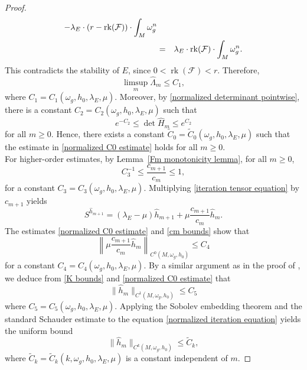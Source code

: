 \documentclass[12pt, reqno]{amsart}
\newcommand\cF{{\mathcal F}}
\newcommand{\rk}{{\rm rk}}
\theoremstyle{plain}
\theoremstyle{definition}
\newcommand{\beq}{\begin{equation}}
\newcommand{\eeq}{\end{equation}}
\renewcommand{\hat}{\widehat}
\renewcommand{\tilde}{\widetilde}
\renewcommand{\>}{\rightarrow}
\newcommand{\om}{\omega}
\numberwithin{equation}{section}
\begin{document}
\begin{proof}
\begin{eqnarray}
	-\lambda_E\cdot \left(r-\rk(\cF)\right)\cdot \int_M\omega_g^n\nonumber\\
	&=&\lambda_E\cdot \rk(\cF)\cdot \int_M\omega_g^n.
	\label{stability contradiction inequality}
	\end{eqnarray}
This contradicts the stability of $E$, since $0 < \operatorname{rk}(\mathcal{F}) < r$.  Therefore,
\beq  \limsup_m \hat\Lambda_m\leq C_1, \eeq  
where	 $C_1=C_1(\om_g,h_0,\lambda_E,\mu)$.  Moreover, by
\eqref{normalized determinant pointwise}, there is a constant
$C_2=C_2(\om_g,h_0,\lambda_E,\mu)$ such that
\beq
e^{-C_2}\leq \det\hat H_m\leq e^{C_2}\label{det hat H bound}
\eeq
for all $m\geq 0$. 
	Hence, there exists a constant $\tilde C_0=\tilde C_0(\om_g,h_0,\lambda_E,\mu)$ such that the estimate in \eqref{normalized C0 estimate} holds for all $m\geq 0$.\\
	
	For higher-order estimates, by Lemma~\ref{Fm monotonicity lemma}, for all $m\geq 0$,
	\beq
	C_3^{-1}\leq\frac{c_{m+1}}{c_{m}}\leq1,\label{cm bounds}
	\eeq
	for a constant $C_3=C_3(\omega_g, h_0,\lambda_E,\mu)$.  Multiplying 
	\eqref{iteration tensor equation} by $c_{m+1}$  yields
	\begin{equation}
	S^{\hat h_{m+1}}=(\lambda_E-\mu)\hat h_{m+1}+\mu\frac{c_{m+1}}{c_{m}}\hat h_{m}.
	\label{normalized iteration equation}
	\end{equation}
	The estimates \eqref{normalized C0 estimate} and \eqref{cm bounds} show that 
	\beq
	\left\|\mu\frac{c_{m+1}}{c_{m}}\hat h_{m}\right\|_{C^0(M,\om_g,h_0)}\leq C_4
	\eeq 
	for a constant $C_4=C_4(\om_g,h_0,\lambda_E,\mu)$. 
	By a similar argument as in the  proof of
	\cite[Theorem~2.5]{XYY26+}, we deduce from \eqref{K bounds} and \eqref{normalized C0 estimate} that 
	\beq \|\hat h_m\|_{C^1(M,\omega_g, h_0)} \leq C_5\eeq 
	where $C_5=C_5(\om_g,h_0,\lambda_E,\mu)$.
Applying the Sobolev embedding theorem and the standard Schauder estimate to the equation
\eqref{normalized iteration equation} yields the uniform bound
\begin{equation}
\|\hat h_m\|_{C^{k}(M,\omega_g, h_0)} \leq \tilde C_k,
\end{equation}
where $\tilde C_k=\tilde C_k(k,\om_g,h_0,\lambda_E,\mu)$ is a constant independent of $m$.
\end{proof}
\end{document}
